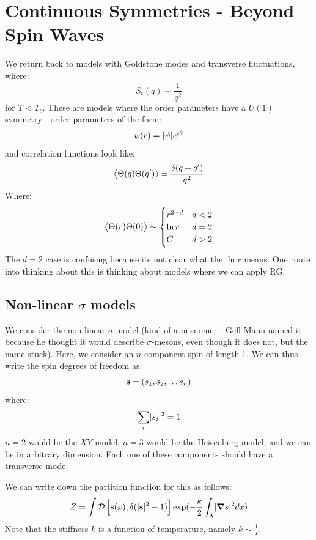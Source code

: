 \section{Continuous Symmetries - Beyond Spin Waves}
We return back to models with Goldstone modes and transverse fluctuations, where:
\begin{equation}
    S_t(q) \sim \frac{1}{q^2}
\end{equation}
for $T < T_c$. These are models where the order parameters have a $U(1)$ symmetry - order parameters of the form:
\begin{equation}
    \psi(r) = \lvert \psi \rvert e^{i\theta}
\end{equation}
and correlation functions look like:
\begin{equation}
    \left< \Theta(q)\Theta(q') \right> = \frac{\delta(q + q')}{q^2}
\end{equation}
Where:
\begin{equation}
    \left< \Theta(r)\Theta(0) \right> \sim \begin{cases}
        r^{2-d} & d < 2
        \\ \ln r & d = 2
        \\ C & d > 2
    \end{cases}
\end{equation}
The $d = 2$ case is confusing because its not clear what the $\ln r$ means. One route into thinking about this is thinking about models where we can apply RG. 

\subsection{Non-linear $\sigma$ models}
We consider the non-linear $\sigma$ model (kind of a misnomer - Gell-Mann named it because he thought it would describe $\sigma$-mesons, even though it does not, but the name stuck). Here, we consider an $n$-component spin of length 1. We can thus write the spin degrees of freedom as:
\begin{equation}
    \mathbf{s} = (s_1, s_2, \ldots s_n)
\end{equation}
where:
\begin{equation}
    \sum_i \lvert s_i \rvert^2 = 1
\end{equation}
$n = 2$ would be the $XY$-model, $n = 3$ would be the Heisenberg model, and we can be in arbitrary dimension. Each one of these components should have a transverse mode.

We can write down the partition function for this as follows:
\begin{equation}
    Z = \int \mathcal{D}\left[\v{s}(x), \delta(\abs{\v{s}}^2 - 1)\right]\exp(-\frac{k}{2}\int_{\Lambda}\abs{\nabla s}^2 dx)
\end{equation}
Note that the stiffness $k$ is a function of temperature, namely $k \sim \frac{1}{T}$.

